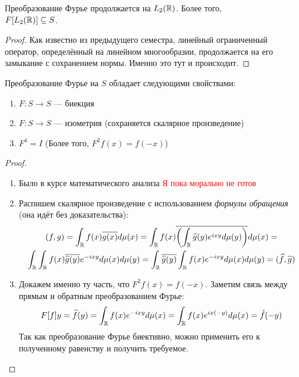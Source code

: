 \begin{proposition}
	Преобразование Фурье продолжается на $L_2(\mathbb{R})$. Более того, \\ $F[L_2(\mathbb{R})] \subseteq S$.
\end{proposition}

\begin{proof}
	Как известно из предыдущего семестра, линейный ограниченный оператор, определённый на линейном многообразии, продолжается на его замыкание с сохранением нормы. Именно это тут и происходит.
\end{proof}

\begin{proposition}
	Преобразование Фурье на $S$ обладает следующими свойствами:
	\begin{enumerate}
		\item $F \colon S \to S$ --- биекция
		
		\item $F \colon S \to S$ --- изометрия (сохраняется скалярное произведение)
		
		\item $F^4 = I$ (Более того, $F^2f(x) = f(-x)$)
	\end{enumerate}
\end{proposition}

\begin{proof}~
	\begin{enumerate}
		\item Было в курсе математического анализа \textcolor{red}{Я пока морально не готов}
		
		\item Распишем скалярное произведение с использованием \textit{формулы обращения} (она идёт без доказательства):
		\begin{multline*}
			(f, g) = \int_{\mathbb{R}} f(x)\overline{g(x)}d\mu(x) = \int_{\mathbb{R}} f(x)\overline{\left(\int_{\mathbb{R}} \widehat{g}(y)e^{ixy}d\mu(y)\right)}d\mu(x) =
			\\
			\int_{\mathbb{R}} \int_{\mathbb{R}} f(x)\overline{\widehat{g}(y)}e^{-ixy}d\mu(x)d\mu(y) = \int_{\mathbb{R}} \overline{\widehat{g}(y)} \int_{\mathbb{R}} f(x)e^{-ixy}d\mu(x)d\mu(y) = (\widehat{f}, \widehat{g})
		\end{multline*}
		
		\item Докажем именно ту часть, что $F^2f(x) = f(-x)$. Заметим связь между прямым и обратным преобразованием Фурье:
		\[
			F[f]y = \widehat{f}(y) = \int_{\mathbb{R}} f(x)e^{-ixy}d\mu(x) = \int_{\mathbb{R}} f(x)e^{ix(-y)}d\mu(x) = \check{f}(-y)
		\]
		Так как преобразование Фурье биективно, можно применить его к полученному равенству и получить требуемое.
	\end{enumerate}
\end{proof}

